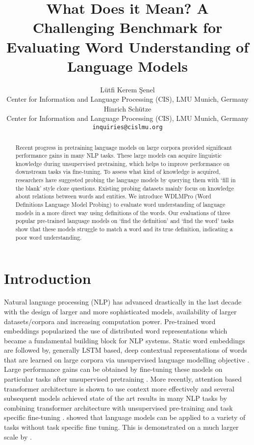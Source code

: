 \documentclass[11pt,a4paper]{article}
\title{What Does it Mean? A Challenging Benchmark for Evaluating Word Understanding of Language Models}
\author{Lütfi Kerem Şenel \\
  Center for Information and Language Processing (CIS), LMU Munich, Germany \\
  Hinrich Schütze \\
    Center for Information and Language Processing (CIS), LMU Munich, Germany \\
  \texttt{inquiries@cislmu.org} \\
  }
\date{}
\begin{document}
\maketitle
\begin{abstract}

Recent progress in pretraining language models on large
corpora provided significant performance gains in many NLP
tasks. These large models can acquire linguistic knowledge
during unsupervised pretraining, which helps to improve
performance on downstream tasks via fine-tuning. To assess
what kind of knowledge is acquired, researchers have
suggested probing the language models by querying them with
`fill in the blank' style cloze questions. Existing probing
datasets mainly focus on knowledge about relations between words and entities. We introduce WDLMPro (Word Definitions Language Model Probing) to evaluate word understanding of language models in a more direct way using definitions of the words. Our evaluations of three popular pre-trained language models on `find the definition' and `find the word' tasks show that these models struggle to match a word and its true definition, indicating a poor word understanding.

\end{abstract}



\section{Introduction}

Natural language processing (NLP)  has advanced drastically
in the last decade with the design of larger and more
sophisticated models, availability of larger
datasets/corpora and increasing computation
power. Pre-trained word embeddings
\cite{mikolov13word2vec_b, pennington14glove} popularized
the use of distributed word representations which became a
fundamental building block for NLP systems. Static word
embeddings are followed by, generally LSTM based, deep
contextual representations of words that are learned on
large corpora via unsupervised language modelling objective
\cite{peters18ELMO}. Large performance gains can be obtained
by fine-tuning these models on particular tasks after
unsupervised pretraining \cite{radford18fineTuning,
  howard18ULMFiT}. More recently, attention based
transformer architecture is shown to use context more
effectively \cite{vaswani17transformers} and several
subsequent models achieved state of the art results in many
NLP tasks by combining transformer architecture with
unsupervised pre-training and task specific fine-tuning
\cite{devlin19BERT, liu19RoBERTa}. 
showed that language models can be applied to a variety of
tasks without task specific fine tuning. This is demonstrated on a much larger scale by . 
\end{document}
